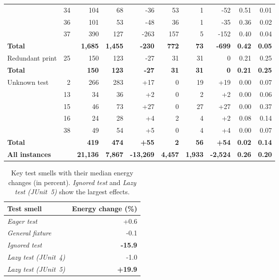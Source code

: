 \begin{xltabular}{\linewidth}{l r r r r r r r r r}
     & 34 & 104 & 68 & -36 & 53 & 1 & -52 & 0.51 & 0.01 \\
     & 36 & 101 & 53 & -48 & 36 & 1 & -35 & 0.36 & 0.02 \\
     & 37 & 390 & 127 & -263 & 157 & 5 & -152 & 0.40 & 0.04 \\
    \textbf{Total} & & \textbf{1,685} & \textbf{1,455} & \textbf{-230} & \textbf{772} & \textbf{73} & \textbf{-699} & \textbf{0.42} & \textbf{0.05} \\
  \midrule
    Redundant print & 25 & 150 & 123 & -27 & 31 & 31 & 0 & 0.21 & 0.25 \\
    \textbf{Total} & & \textbf{150} & \textbf{123} & \textbf{-27} & \textbf{31} & \textbf{31} & \textbf{0} & \textbf{0.21} & \textbf{0.25} \\
  \midrule
    Unknown test & 2 & 266 & 283 & +17 & 0 & 19 & +19 & 0.00 & 0.07 \\
     & 13 & 34 & 36 & +2 & 0 & 2 & +2 & 0.00 & 0.06 \\
     & 15 & 46 & 73 & +27 & 0 & 27 & +27 & 0.00 & 0.37 \\
     & 16 & 24 & 28 & +4 & 2 & 4 & +2 & 0.08 & 0.14 \\
     & 38 & 49 & 54 & +5 & 0 & 4 & +4 & 0.00 & 0.07 \\
    \textbf{Total} & & \textbf{419} & \textbf{474} & \textbf{+55} & \textbf{2} & \textbf{56} & \textbf{+54} & \textbf{0.02} & \textbf{0.14} \\
    \midrule
    \textbf{All instances} & & \textbf{21,136} & \textbf{7,867} & \textbf{-13,269} & \textbf{4,457} & \textbf{1,933} & \textbf{-2,524} & \textbf{0.26} & \textbf{0.20} \\
    \bottomrule
  \end{xltabular}


\begin{xltabular}{\linewidth}{l r}
    \caption{Key test smells with their median energy changes (in percent). \textit{Ignored test} and \textit{Lazy test (JUnit~5)} show the largest effects.}\label{tab:key_smells} \\[10pt]
    \toprule
    \textbf{Test smell} & \textbf{Energy change (\%)} \\
    \midrule
    \textit{Eager test} & +0.6 \\
    \textit{General fixture} & -0.1 \\
    \textit{Ignored test} & \textbf{-15.9} \\
    \textit{Lazy test (JUnit~4)} & -1.0 \\
    \textit{Lazy test (JUnit~5)} & \textbf{+19.9} \\

    \bottomrule
  \end{xltabular}


